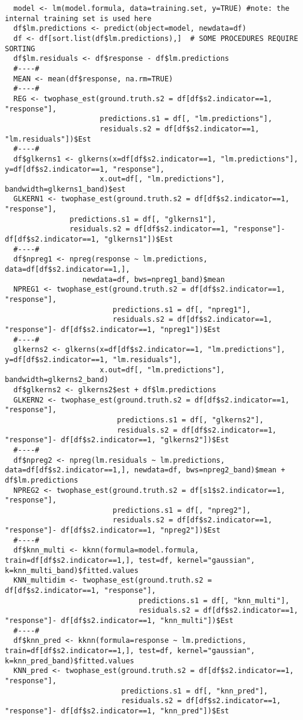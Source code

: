\documentclass[a4paper,12pt,leqno, titlepage]{article}
\begin{document}
\begin{appendix}
{{{{\begin{verbatim}
  model <- lm(model.formula, data=training.set, y=TRUE) #note: the internal training set is used here
  df$lm.predictions <- predict(object=model, newdata=df)
  df <- df[sort.list(df$lm.predictions),]  # SOME PROCEDURES REQUIRE SORTING
  df$lm.residuals <- df$response - df$lm.predictions
  #----#
  MEAN <- mean(df$response, na.rm=TRUE)
  #----#
  REG <- twophase_est(ground.truth.s2 = df[df$s2.indicator==1, "response"],
                      predictions.s1 = df[, "lm.predictions"],
                      residuals.s2 = df[df$s2.indicator==1, "lm.residuals"])$Est
  #----#
  df$glkerns1 <- glkerns(x=df[df$s2.indicator==1, "lm.predictions"], y=df[df$s2.indicator==1, "response"],
                      x.out=df[, "lm.predictions"], bandwidth=glkerns1_band)$est
  GLKERN1 <- twophase_est(ground.truth.s2 = df[df$s2.indicator==1, "response"],
               predictions.s1 = df[, "glkerns1"],
               residuals.s2 = df[df$s2.indicator==1, "response"]- df[df$s2.indicator==1, "glkerns1"])$Est
  #----#
  df$npreg1 <- npreg(response ~ lm.predictions, data=df[df$s2.indicator==1,],
                  newdata=df, bws=npreg1_band)$mean
  NPREG1 <- twophase_est(ground.truth.s2 = df[df$s2.indicator==1, "response"],
                         predictions.s1 = df[, "npreg1"],
                         residuals.s2 = df[df$s2.indicator==1, "response"]- df[df$s2.indicator==1, "npreg1"])$Est
  #----#
  glkerns2 <- glkerns(x=df[df$s2.indicator==1, "lm.predictions"], y=df[df$s2.indicator==1, "lm.residuals"],
                      x.out=df[, "lm.predictions"], bandwidth=glkerns2_band)
  df$glkerns2 <- glkerns2$est + df$lm.predictions
  GLKERN2 <- twophase_est(ground.truth.s2 = df[df$s2.indicator==1, "response"],
                          predictions.s1 = df[, "glkerns2"],
                          residuals.s2 = df[df$s2.indicator==1, "response"]- df[df$s2.indicator==1, "glkerns2"])$Est
  #----#
  df$npreg2 <- npreg(lm.residuals ~ lm.predictions, data=df[df$s2.indicator==1,], newdata=df, bws=npreg2_band)$mean + df$lm.predictions
  NPREG2 <- twophase_est(ground.truth.s2 = df[s1$s2.indicator==1, "response"],
                         predictions.s1 = df[, "npreg2"],
                         residuals.s2 = df[df$s2.indicator==1, "response"]- df[df$s2.indicator==1, "npreg2"])$Est
  #----#
  df$knn_multi <- kknn(formula=model.formula, train=df[df$s2.indicator==1,], test=df, kernel="gaussian", k=knn_multi_band)$fitted.values
  KNN_multidim <- twophase_est(ground.truth.s2 = df[df$s2.indicator==1, "response"],
                               predictions.s1 = df[, "knn_multi"],
                               residuals.s2 = df[df$s2.indicator==1, "response"]- df[df$s2.indicator==1, "knn_multi"])$Est
  #----#
  df$knn_pred <- kknn(formula=response ~ lm.predictions, train=df[df$s2.indicator==1,], test=df, kernel="gaussian", k=knn_pred_band)$fitted.values
  KNN_pred <- twophase_est(ground.truth.s2 = df[df$s2.indicator==1, "response"],
                           predictions.s1 = df[, "knn_pred"],
                           residuals.s2 = df[df$s2.indicator==1, "response"]- df[df$s2.indicator==1, "knn_pred"])$Est


\end{verbatim}}}}}
\end{appendix}
\end{document}
